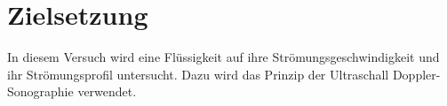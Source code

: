 \section{Zielsetzung}
\label{sec:Zielsetzung}

In diesem Versuch wird eine Flüssigkeit auf ihre Strömungsgeschwindigkeit und ihr Strömungsprofil untersucht.
Dazu wird das Prinzip der Ultraschall Doppler-Sonographie verwendet.